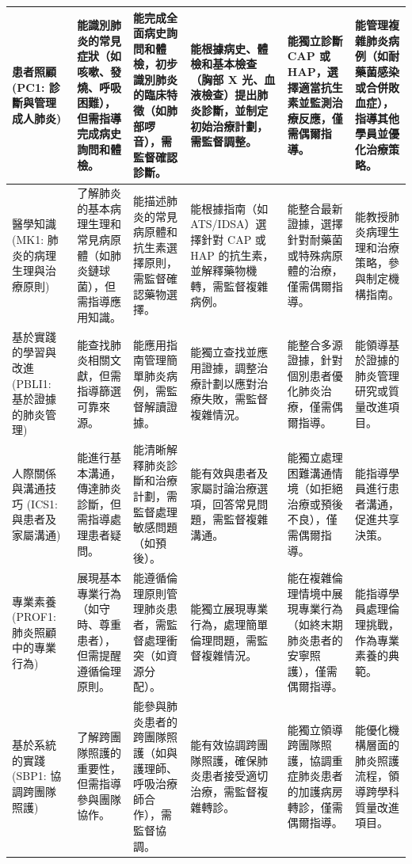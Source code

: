 \documentclass[12pt,a4paper]{article}
\begin{document}
\begin{longtable}{L{2.5cm} L{2.5cm} L{2.5cm} L{2.5cm} L{2.5cm} L{2.5cm}}
    患者照顧 \newline (PC1: 診斷與管理成人肺炎) &
    能識別肺炎的常見症狀（如咳嗽、發燒、呼吸困難），但需指導完成病史詢問和體檢。 &
    能完成全面病史詢問和體檢，初步識別肺炎的臨床特徵（如肺部啰音），需監督確認診斷。 &
    能根據病史、體檢和基本檢查（胸部 X 光、血液檢查）提出肺炎診斷，並制定初始治療計劃，需監督調整。 &
    能獨立診斷 CAP 或 HAP，選擇適當抗生素並監測治療反應，僅需偶爾指導。 &
    能管理複雜肺炎病例（如耐藥菌感染或合併敗血症），指導其他學員並優化治療策略。 \\
    \midrule
    醫學知識 \newline (MK1: 肺炎的病理生理與治療原則) &
    了解肺炎的基本病理生理和常見病原體（如肺炎鏈球菌），但需指導應用知識。 &
    能描述肺炎的常見病原體和抗生素選擇原則，需監督確認藥物選擇。 &
    能根據指南（如 ATS/IDSA）選擇針對 CAP 或 HAP 的抗生素，並解釋藥物機轉，需監督複雜病例。 &
    能整合最新證據，選擇針對耐藥菌或特殊病原體的治療，僅需偶爾指導。 &
    能教授肺炎病理生理和治療策略，參與制定機構指南。 \\
    \midrule
    基於實踐的學習與改進 \newline (PBLI1: 基於證據的肺炎管理) &
    能查找肺炎相關文獻，但需指導篩選可靠來源。 &
    能應用指南管理簡單肺炎病例，需監督解讀證據。 &
    能獨立查找並應用證據，調整治療計劃以應對治療失敗，需監督複雜情況。 &
    能整合多源證據，針對個別患者優化肺炎治療，僅需偶爾指導。 &
    能領導基於證據的肺炎管理研究或質量改進項目。 \\
    \midrule
    人際關係與溝通技巧 \newline (ICS1: 與患者及家屬溝通) &
    能進行基本溝通，傳達肺炎診斷，但需指導處理患者疑問。 &
    能清晰解釋肺炎診斷和治療計劃，需監督處理敏感問題（如預後）。 &
    能有效與患者及家屬討論治療選項，回答常見問題，需監督複雜溝通。 &
    能獨立處理困難溝通情境（如拒絕治療或預後不良），僅需偶爾指導。 &
    能指導學員進行患者溝通，促進共享決策。 \\
    \midrule
    專業素養 \newline (PROF1: 肺炎照顧中的專業行為) &
    展現基本專業行為（如守時、尊重患者），但需提醒遵循倫理原則。 &
    能遵循倫理原則管理肺炎患者，需監督處理衝突（如資源分配）。 &
    能獨立展現專業行為，處理簡單倫理問題，需監督複雜情況。 &
    能在複雜倫理情境中展現專業行為（如終末期肺炎患者的安寧照護），僅需偶爾指導。 &
    能指導學員處理倫理挑戰，作為專業素養的典範。 \\
    \midrule
    基於系統的實踐 \newline (SBP1: 協調跨團隊照護) &
    了解跨團隊照護的重要性，但需指導參與團隊協作。 &
    能參與肺炎患者的跨團隊照護（如與護理師、呼吸治療師合作），需監督協調。 &
    能有效協調跨團隊照護，確保肺炎患者接受適切治療，需監督複雜轉診。 &
    能獨立領導跨團隊照護，協調重症肺炎患者的加護病房轉診，僅需偶爾指導。 &
    能優化機構層面的肺炎照護流程，領導跨學科質量改進項目。 \\
\end{longtable}
\end{document}
